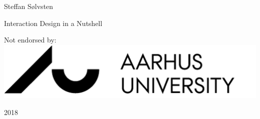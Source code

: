 \begin{titlepage}
  \begin{adjustwidth*}{}{}
    \raggedleft

    \vspace*{1cm}
    {\LARGE Steffan Sølvsten}
    
    \vspace*{2cm}
    {\Huge Interaction Design in a Nutshell}

    \vspace*{14cm}
    {\small Not endorsed by: }
    \includegraphics[scale=0.09]{part_frontmatter/img/aulogo_uk_var2_black.png}
    
    \vspace*{0.2cm}
    {\large 2018}
  \end{adjustwidth*}
\end{titlepage}
